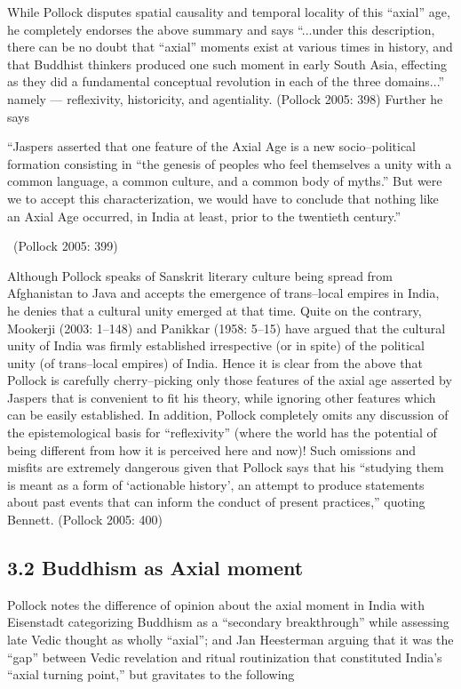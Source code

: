 While Pollock disputes spatial causality and temporal locality of this “axial” age, he completely endorses the above summary and says “...under this description, there can be no doubt that “axial” moments exist at various times in history, and that Buddhist thinkers produced one such moment in early South Asia, effecting as they did a fundamental conceptual revolution in each of the three domains...” namely — reflexivity, historicity, and agentiality. (Pollock 2005: 398) Further he says

\begin{myquote}
“Jaspers asserted that one feature of the Axial Age is a new socio–political formation consisting in “the genesis of peoples who feel themselves a unity with a common language, a common culture, and a common body of myths.” But were we to accept this characterization, we would have to conclude that nothing like an Axial Age occurred, in India at least, prior to the twentieth century.” 

~\hfill (Pollock 2005: 399)
\end{myquote}

Although Pollock speaks of Sanskrit literary culture being spread from Afghanistan to Java and accepts the emergence of trans–local empires in India, he denies that a cultural unity emerged at that time. Quite on the contrary, Mookerji (2003: 1–148) and Panikkar (1958: 5–15) have argued that the cultural unity of India was firmly established irrespective (or in spite) of the political unity (of trans–local empires) of India. Hence it is clear from the above that Pollock is carefully cherry–picking only those features of the axial age asserted by Jaspers that is convenient to fit his theory, while ignoring other features which can be easily established. In addition, Pollock completely omits any discussion of the epistemological basis for “reflexivity” (where the world has the potential of being different from how it is perceived here and now)! Such omissions and misfits are extremely dangerous given that Pollock says that his “studying them is meant as a form of ‘actionable history’, an attempt to produce statements about past events that can inform the conduct of present practices,” quoting Bennett. (Pollock 2005: 400)


\subsection*{3.2 Buddhism as Axial moment}

Pollock notes the difference of opinion about the axial moment in India with Eisenstadt categorizing Buddhism as a “secondary breakthrough” while assessing late Vedic thought as wholly “axial”; and Jan Heesterman arguing that it was the “gap” between Vedic revelation and ritual routinization that constituted India’s “axial turning point,” but gravitates to the following

